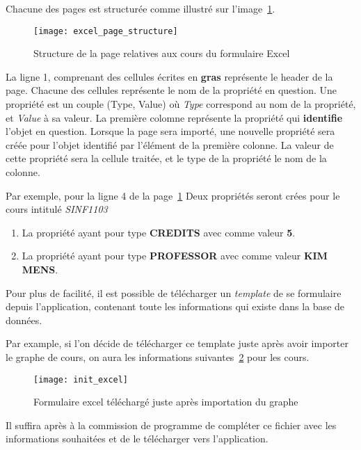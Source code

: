 Chacune des pages est structurée comme illustré sur l'image~\ref{fig:excel_page_structure}. 

\begin{figure}[H]
\centering
\caption{Structure de la page relatives aux cours du formulaire Excel}
\label{fig:excel_page_structure}
\texttt{[image: excel\_page\_structure]}
\end{figure}

La ligne 1, comprenant des cellules écrites en \textbf{gras} représente le header de la page. Chacune des cellules représente le nom de la propriété en question. Une propriété est un couple (Type, Value) où \textit{Type} correspond au nom de la propriété, et \textit{Value} à sa valeur. La première colomne représente la propriété qui \textbf{identifie} l'objet en question. Lorsque la page sera importé, une nouvelle propriété sera créée pour l'objet identifié par l'élément de la première colonne. La valeur de cette propriété sera la cellule traitée, et le type de la propriété le nom de la colonne. 

Par exemple, pour la ligne 4 de la page~\ref{fig:excel_page_structure}
Deux propriétés seront crées pour le cours intitulé \textit{SINF1103}
\begin{enumerate}
\item La propriété ayant pour type \textbf{CREDITS} avec comme valeur \textbf{5}.
\item La propriété ayant pour type \textbf{PROFESSOR} avec comme valeur \textbf{KIM MENS}.
\end{enumerate}

Pour plus de facilité, il est possible de télécharger un \textit{template} de se formulaire depuis l'application, contenant toute les informations qui existe dans la base de données. 

Par example, si l'on décide de télécharger ce template juste après avoir importer le graphe de cours, on aura les informations suivantes~\ref{fig:init_excel} pour les cours. 

\begin{figure}[H]
\caption{Formulaire excel téléchargé juste après importation du graphe}
\label{fig:init_excel}
\texttt{[image: init\_excel]}
\end{figure}

Il suffira après à la commission de programme de compléter ce fichier avec les informations souhaitées et de le télécharger vers l'application.

        